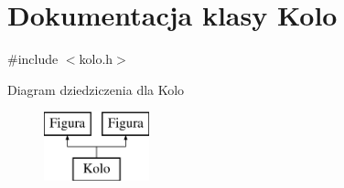 \hypertarget{classKolo}{\section{Dokumentacja klasy Kolo}
\label{classKolo}
}


{\ttfamily \#include $<$kolo.\-h$>$}

Diagram dziedziczenia dla Kolo\begin{figure}[H]
\begin{center}
\leavevmode
\includegraphics[height=2.000000cm]{d6/d1e/classKolo}
\end{center}
\end{figure}
